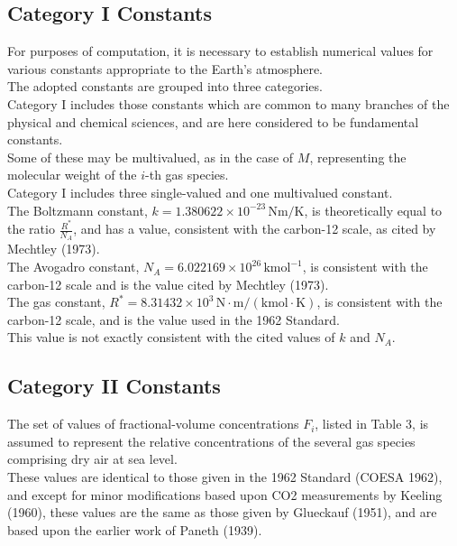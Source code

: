 \documentclass{article}
\begin{document}
\subsection{Category I Constants}

For purposes of computation, it is necessary to establish numerical values for various constants appropriate to the Earth's atmosphere.\\
The adopted constants are grouped into three categories.\\

Category I includes those constants which are common to many branches of the physical and chemical sciences, and are here considered to be fundamental constants.\\
Some of these may be multivalued, as in the case of \(M\), representing the molecular weight of the \(i\)-th gas species.\\
Category I includes three single-valued and one multivalued constant.\\

The Boltzmann constant, \(k = 1.380622 \times 10^{-23} \, \mathrm{Nm/K}\), is theoretically equal to the ratio \(\frac{R^*}{N_A}\), and has a value, consistent with the carbon-12 scale, as cited by Mechtley (1973).\\

The Avogadro constant, \(N_A = 6.022169 \times 10^{26} \, \mathrm{kmol}^{-1}\), is consistent with the carbon-12 scale and is the value cited by Mechtley (1973).\\

The gas constant, \(R^* = 8.31432 \times 10^{3} \, \mathrm{N \cdot m / (kmol \cdot K)}\), is consistent with the carbon-12 scale, and is the value used in the 1962 Standard.\\
This value is not exactly consistent with the cited values of \(k\) and \(N_A\).\\

\subsection{Category II Constants}

The set of values of fractional-volume concentrations \(F_i\), listed in Table 3, is assumed to represent the relative concentrations of the several gas species comprising dry air at sea level.\\
These values are identical to those given in the 1962 Standard (COESA 1962), and except for minor modifications based upon CO2 measurements by Keeling (1960), these values are the same as those given by Glueckauf (1951), and are based upon the earlier work of Paneth (1939).\\
\end{document}

